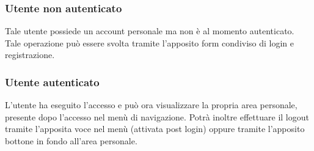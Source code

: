 \subsubsection{Utente non autenticato} Tale utente possiede un account personale ma non è al momento autenticato. Tale operazione può essere svolta tramite l'apposito form condiviso di login e registrazione.
\subsubsection{Utente autenticato} L'utente ha eseguito l'accesso e può ora visualizzare la propria area personale, presente dopo l'accesso nel menù di navigazione. Potrà inoltre effettuare il logout tramite l'apposita voce nel menù (attivata post login) oppure tramite l'apposito bottone in fondo all'area personale.




